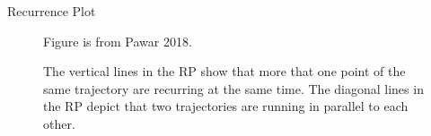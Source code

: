 {{%














{

\begin{frame}{Recurrence Plot}

    \begin{figure}
	{Figure is from Pawar 2018.} 
	\caption{
The vertical lines in the RP show that more that one point of 
the same trajectory are recurring at the same time.
The diagonal lines in the RP depict that two trajectories are running in parallel
to each other.
}
   
\end{figure}
	


%



\end{frame}}}}
